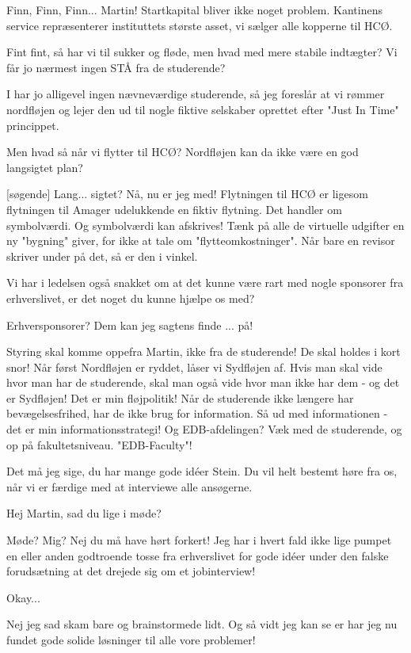 \documentclass[a4paper,11pt]{article}
\begin{document}
\begin{sketch}
 Finn, Finn, Finn... Martin!
Startkapital bliver ikke noget problem. Kantinens service
repræsenterer instituttets største asset, vi sælger alle kopperne til
HCØ.

 Fint fint, så har vi til sukker og fløde, men hvad med mere
stabile indtægter? Vi får jo nærmest ingen STÅ fra de studerende?

 I har jo alligevel ingen nævneværdige studerende, så jeg
foreslår at vi rømmer nordfløjen og lejer den ud til nogle fiktive
selskaber oprettet efter "Just In Time" princippet.

 Men hvad så når vi flytter til HCØ? Nordfløjen kan da
ikke være en god langsigtet plan?

[søgende] Lang... sigtet? Nå, nu er jeg med!  Flytningen til
HCØ er ligesom flytningen til Amager udelukkende en fiktiv
flytning. Det handler om symbolværdi. Og symbolværdi kan afskrives!
Tænk på alle de virtuelle udgifter en ny "bygning" giver, for ikke at
tale om "flytteomkostninger". Når bare en revisor skriver under på
det, så er den i vinkel.

 Vi har i ledelsen også snakket om at det kunne være rart
med nogle sponsorer fra erhverslivet, er det noget du kunne hjælpe os
med?

 Erhversponsorer? Dem kan jeg sagtens finde ... på!


 Styring skal komme oppefra Martin, ikke fra de studerende!
De skal holdes i kort snor! Når først Nordfløjen er ryddet, låser vi
Sydfløjen af. Hvis man skal vide hvor man har de studerende, skal man
også vide hvor man ikke har dem - og det er Sydfløjen! Det er min
fløjpolitik! Når de studerende ikke længere har bevægelsesfrihed, har
de ikke brug for information. Så ud med informationen - det er min
informationsstrategi! Og EDB-afdelingen? Væk med de studerende, og op
på fakultetsniveau. "EDB-Faculty"! 

 Det må jeg sige, du har mange gode idéer Stein. Du vil helt
bestemt høre fra os, når vi er færdige med at interviewe alle
ansøgerne.


 Hej Martin, sad du lige i møde?

 Møde? Mig? Nej du må have hørt forkert! Jeg har i hvert fald
ikke lige pumpet en eller anden godtroende tosse fra erhverslivet for
gode idéer under den falske forudsætning at det drejede sig om et
jobinterview!

  Okay...

 Nej jeg sad skam bare og brainstormede lidt. Og så vidt jeg
kan se er har jeg nu fundet gode solide løsninger til alle vore
problemer!


\end{sketch}
\end{document}
